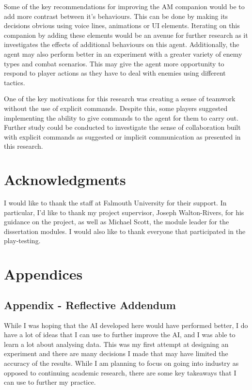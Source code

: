 \documentclass{IEEEtran}
\begin{document}
Some of the key recommendations for improving the AM companion would be to add more contrast between it's behaviours. This can be done by making its decisions obvious using voice lines, animations or UI elements. Iterating on this companion by adding these elements would be an avenue for further research as it investigates the effects of additional behaviours on this agent. Additionally, the agent may also perform better in an experiment with a greater variety of enemy types and combat scenarios. This may give the agent more opportunity to respond to player actions as they have to deal with enemies using different tactics.

One of the key motivations for this research was creating a sense of teamwork without the use of explicit commands. Despite this, some players suggested implementing the ability to give commands to the agent for them to carry out. Further study could be conducted to investigate the sense of collaboration built with explicit commands as suggested or implicit communication as presented in this research.

\section*{Acknowledgments}

I would like to thank the staff at Falmouth University for their support. In particular, I'd like to thank my project supervisor, Joseph Walton-Rivers, for his guidance on the project, as well as Michael Scott, the module leader for the dissertation modules. I would also like to thank everyone that participated in the play-testing.


 

 \newpage

\onecolumn

\appendix 

\section{Appendices}
\label{Appendices}

\subsection{Appendix - Reflective Addendum}
\label{AppendixReflection}

While I was hoping that the AI developed here would have performed better, I do have a lot of ideas that I can use to further improve the AI, and I was able to learn a lot about analysing data. This was my first attempt at designing an experiment and there are many decisions I made that may have limited the accuracy of the results. While I am planning to focus on going into industry as opposed to continuing academic research, there are some key takeaways that I can use to further my practice.
\end{document}
